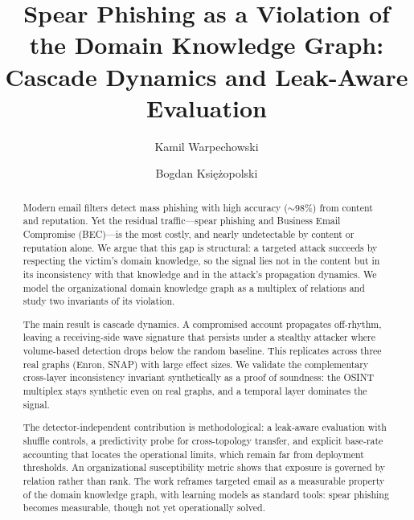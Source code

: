 \documentclass[a4paper,fleqn]{cas-sc}
\begin{document}
\let\WriteBookmarks\relax


\title[mode=title]{Spear Phishing as a Violation of the Domain Knowledge Graph:
Cascade Dynamics and Leak-Aware Evaluation}

\author[1,2]{Kamil Warpechowski}
\cormark[1]


\author[1]{Bogdan Ksi{\k{e}}{\.z}opolski}


\begin{abstract}
Modern email filters detect mass phishing with high accuracy ($\sim$98\%) from content and reputation. Yet the
residual traffic---spear phishing and Business Email Compromise (BEC)---is the most costly, and nearly undetectable by content or reputation alone. We argue that this gap is structural: a targeted attack succeeds by respecting the victim's domain
knowledge, so the signal lies not in the content but in its inconsistency with that knowledge and in the attack's
propagation dynamics. We model the organizational domain knowledge graph as a multiplex of relations and study
two invariants of its violation.

The main result is cascade dynamics. A compromised account propagates off-rhythm, leaving a
receiving-side wave signature that persists under a stealthy attacker where volume-based detection drops below
the random baseline. This replicates across three real graphs (Enron, SNAP) with large effect sizes. We validate the complementary cross-layer inconsistency invariant synthetically as a proof of soundness: the OSINT multiplex stays synthetic even on real graphs, and a temporal layer dominates the signal.

The detector-independent contribution is methodological: a leak-aware evaluation with shuffle controls,
a predictivity probe for cross-topology transfer, and explicit base-rate accounting that locates the operational
limits, which remain far from deployment thresholds. An organizational susceptibility metric shows that exposure
is governed by relation rather than rank. The work reframes targeted email as a measurable property of the
domain knowledge graph, with learning models as standard tools: spear phishing becomes measurable,
though not yet operationally solved.
\end{abstract}
\end{document}
